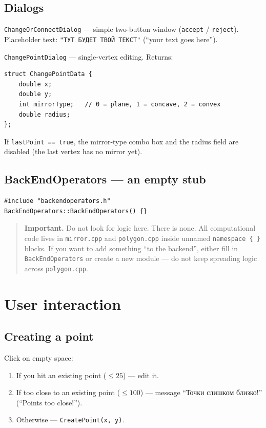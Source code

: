 \documentclass[a4paper,11pt]{article}
\newcommand{\file}[1]{\texttt{#1}}
\newcommand{\code}[1]{\texttt{#1}}
\begin{document}
\subsection{Dialogs}

\code{ChangeOrConnectDialog} — simple two-button window
(\code{accept} / \code{reject}). Placeholder text:
\code{"ТУТ БУДЕТ ТВОЙ ТЕКСТ"} (``your text goes here'').

\code{ChangePointDialog} — single-vertex editing. Returns:

\begin{lstlisting}
struct ChangePointData {
    double x;
    double y;
    int mirrorType;   // 0 = plane, 1 = concave, 2 = convex
    double radius;
};
\end{lstlisting}

If \code{lastPoint == true}, the mirror-type combo box and the radius
field are disabled (the last vertex has no mirror yet).

\subsection{BackEndOperators — an empty stub}

\begin{lstlisting}[caption={The entire backendoperators.cpp}]
#include "backendoperators.h"
BackEndOperators::BackEndOperators() {}
\end{lstlisting}

\begin{quote}
\textbf{Important.} Do not look for logic here. There is none. All
computational code lives in \file{mirror.cpp} and \file{polygon.cpp}
inside unnamed \code{namespace \{ \}} blocks. If you want to add
something ``to the backend'', either fill in \code{BackEndOperators}
or create a new module — do not keep spreading logic across
\file{polygon.cpp}.
\end{quote}

\section{User interaction}

\subsection{Creating a point}

Click on empty space:
\begin{enumerate}[leftmargin=*]
    \item If you hit an existing point ($\le 25$) — edit it.
    \item If too close to an existing point ($\le 100$) — message ``Точки слишком близко!'' (``Points too close!'').
    \item Otherwise — \code{CreatePoint(x, y)}.
\end{enumerate}
\end{document}
